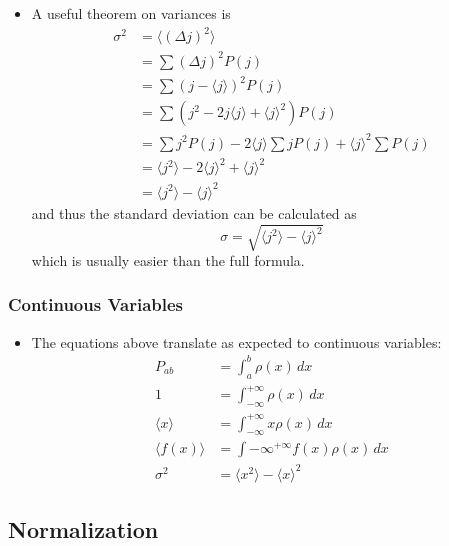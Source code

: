 \documentclass{article}
\newcommand{\ev}[1]{\langle #1 \rangle}
\begin{document}
\begin{itemize}
  \item A useful theorem on variances is \begin{align*}
          \sigma^2 & = \langle (\Delta j)^2 \rangle                              \\
                   & = \sum (\Delta j)^2 P(j)                                    \\
                   & = \sum (j - \ev{j})^2 P(j)                                  \\
                   & = \sum (j^2 - 2 j \ev{j} + \ev{j}^2) P(j)                   \\
                   & = \sum j^2 P(j) - 2 \ev{j} \sum j P(j) + \ev{j}^2 \sum P(j) \\
                   & = \ev{j^2} - 2 \ev{j}^2 + \ev{j}^2                          \\
                   & = \ev{j^2} - \ev{j}^2
        \end{align*} and thus the standard deviation can be calculated as \[\sigma = \sqrt{\ev{j^2} - \ev{j}^2}\] which is usually easier than the full formula.
\end{itemize}

\subsubsection{Continuous Variables}

\begin{itemize}
  \item The equations above translate as expected to continuous variables: \begin{align*}
          P_{a b}   & = \int_a^b \rho(x) \,d x                     \\
          1         & = \int_{-\infty}^{+\infty} \rho(x) \,d x     \\
          \ev{x}    & = \int_{-\infty}^{+\infty} x \rho(x) \,d x   \\
          \ev{f(x)} & = \int{-\infty}^{+\infty} f(x) \rho(x) \,d x \\
          \sigma^2  & = \ev{x^2} - \ev{x}^2
        \end{align*}
\end{itemize}

\subsection{Normalization}
\end{document}
